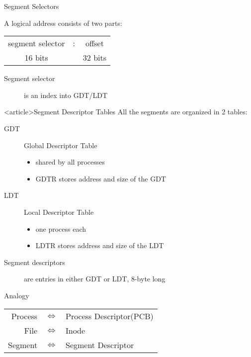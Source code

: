 \begin{frame}{Segment Selectors}
  \begin{iblock}{A logical address consists of two parts:}
    \begin{center}
      \begin{tabular}{ccc}
        segment selector&:&offset\\
        {\scriptsize 16 bits}&&{\scriptsize 32 bits}
      \end{tabular}
    \end{center}
  \end{iblock}
  \vspace{1em}
  \begin{description}
  \item[Segment selector] is an index into GDT/LDT
  \end{description}
    \begin{center}
    \end{center}
\end{frame}

\begin{frame}<article>{Segment Descriptor Tables}
    All the segments are organized in 2 tables:
    \begin{description}
    \item[GDT] \alert{Global Descriptor Table}
      \begin{itemize}
      \item shared by all processes
      \item GDTR stores address and size of the GDT
      \end{itemize}
    \item[LDT] \alert{Local Descriptor Table}
      \begin{itemize}
      \item one process each
      \item LDTR stores address and size of the LDT
      \end{itemize}
    \item[Segment descriptors] are entries in either GDT or LDT, 8-byte long
    \end{description}
      \begin{iblock}{Analogy}
        \begin{center}
          \begin{tabular}{rcl}
            Process&$\Longleftrightarrow$&Process Descriptor(PCB)\\
            File&$\Longleftrightarrow$&Inode\\
            Segment&$\Longleftrightarrow$&Segment Descriptor
          \end{tabular}
        \end{center}
      \end{iblock}
\end{frame}

